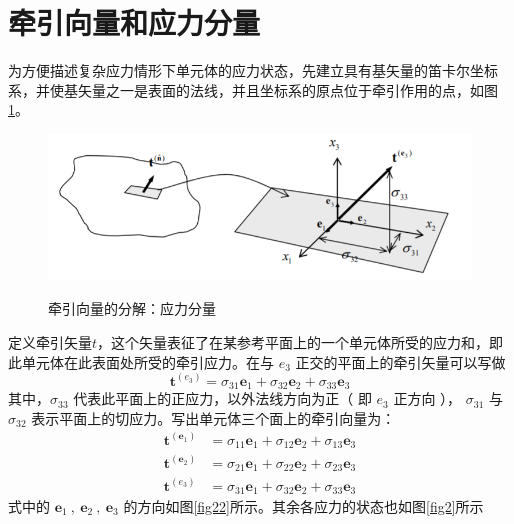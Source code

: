 \documentclass[12pt, a4paper]{ctexart}
\begin{document}
\section{牵引向量和应力分量}
为方便描述复杂应力情形下单元体的应力状态，先建立具有基矢量的笛卡尔坐标系，并使基矢量之一是表面的法线，并且坐标系的原点位于牵引作用的点，如图\ref{fig1}。
\begin{figure}[ht]
	\centering
	\includegraphics[scale=0.8]{21.png}
	\label{fig1}
	\caption{牵引向量的分解：应力分量}
\end{figure}
定义牵引矢量$ t $，这个矢量表征了在某参考平面上的一个单元体所受的应力和，即此单元体在此表面处所受的牵引应力。在与 $ e_3 $ 正交的平面上的牵引矢量可以写做
\begin{equation}
\mathbf{t}^{\left(e_{3}\right)}=\sigma_{31} \mathbf{e}_{1}+\sigma_{32} \mathbf{e}_{2}+\sigma_{33} \mathbf{e}_{3}
\end{equation}
其中，$ \sigma_{33} $ 代表此平面上的正应力，以外法线方向为正（ 即 $ e_3 $ 正方向 ）， $ \sigma_{31} $ 与 $ \sigma_{32} $ 表示平面上的切应力。写出单元体三个面上的牵引向量为：
\begin{equation} \label{eq1}
\begin{aligned} \mathbf{t}^{\left(\mathbf{e}_{1}\right)} &=\sigma_{11} \mathbf{e}_{1}+\sigma_{12} \mathbf{e}_{2}+\sigma_{13} \mathbf{e}_{3} \\ \mathbf{t}^{\left(\mathbf{e}_{2}\right)} &=\sigma_{21} \mathbf{e}_{1}+\sigma_{22} \mathbf{e}_{2}+\sigma_{23} \mathbf{e}_{3} \\ \mathbf{t}^{\left(e_{3}\right)} &=\sigma_{31} \mathbf{e}_{1}+\sigma_{32} \mathbf{e}_{2}+\sigma_{33} \mathbf{e}_{3} \end{aligned}
\end{equation}
式中的 $  \mathbf{e}_{1}~,~ \mathbf{e}_{2} ~,~ \mathbf{e}_{3} $ 的方向如图\ref{fig22}所示。其余各应力的状态也如图\ref{fig2}所示
\end{document}
